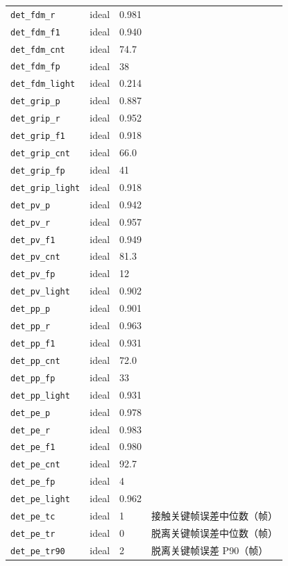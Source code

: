 \begin{longtable}{p{3.2cm}p{0.9cm}p{4.2cm}p{6.2cm}}
\texttt{det\_fdm\_r} & ideal & 0.981 & \\
\texttt{det\_fdm\_f1} & ideal & 0.940 & \\
\texttt{det\_fdm\_cnt} & ideal & 74.7 & \\
\texttt{det\_fdm\_fp} & ideal & 38 & \\
\texttt{det\_fdm\_light} & ideal & 0.214 & \\
\texttt{det\_grip\_p} & ideal & 0.887 & \\
\texttt{det\_grip\_r} & ideal & 0.952 & \\
\texttt{det\_grip\_f1} & ideal & 0.918 & \\
\texttt{det\_grip\_cnt} & ideal & 66.0 & \\
\texttt{det\_grip\_fp} & ideal & 41 & \\
\texttt{det\_grip\_light} & ideal & 0.918 & \\
\texttt{det\_pv\_p} & ideal & 0.942 & \\
\texttt{det\_pv\_r} & ideal & 0.957 & \\
\texttt{det\_pv\_f1} & ideal & 0.949 & \\
\texttt{det\_pv\_cnt} & ideal & 81.3 & \\
\texttt{det\_pv\_fp} & ideal & 12 & \\
\texttt{det\_pv\_light} & ideal & 0.902 & \\
\texttt{det\_pp\_p} & ideal & 0.901 & \\
\texttt{det\_pp\_r} & ideal & 0.963 & \\
\texttt{det\_pp\_f1} & ideal & 0.931 & \\
\texttt{det\_pp\_cnt} & ideal & 72.0 & \\
\texttt{det\_pp\_fp} & ideal & 33 & \\
\texttt{det\_pp\_light} & ideal & 0.931 & \\
\texttt{det\_pe\_p} & ideal & 0.978 & \\
\texttt{det\_pe\_r} & ideal & 0.983 & \\
\texttt{det\_pe\_f1} & ideal & 0.980 & \\
\texttt{det\_pe\_cnt} & ideal & 92.7 & \\
\texttt{det\_pe\_fp} & ideal & 4 & \\
\texttt{det\_pe\_light} & ideal & 0.962 & \\
\texttt{det\_pe\_tc} & ideal & 1 & 接触关键帧误差中位数（帧）\\
\texttt{det\_pe\_tr} & ideal & 0 & 脱离关键帧误差中位数（帧）\\
\texttt{det\_pe\_tr90} & ideal & 2 & 脱离关键帧误差 P90（帧）\\

\end{longtable}
